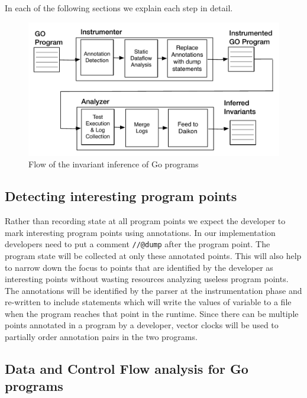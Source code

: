 In each of the following sections we explain each step in detail.
\begin{figure}
  \includegraphics[width=\columnwidth]{go_flow.pdf}
  \caption{Flow of the invariant inference of Go programs}
  \label{fig:go_flow}
\end{figure}



\subsection{Detecting interesting program points}

Rather than recording state at all program points we expect the
developer to mark interesting program points using annotations. In our implementation developers need to put a comment \texttt{//@dump} after the program point. The
program state will be collected at only these annotated points. This will
also help to narrow down the focus to points that are identified by
the developer as interesting points without wasting resources
analyzing useless program points. The annotations will be identified
by the parser at the instrumentation phase and re-written to include
statements which will write the values of variable to a file when the
program reaches that point in the runtime. Since there can be multiple points annotated in a program by a
developer, vector clocks will be used to partially order annotation
pairs in the two programs.%

\subsection{Data and Control Flow analysis for Go programs}

